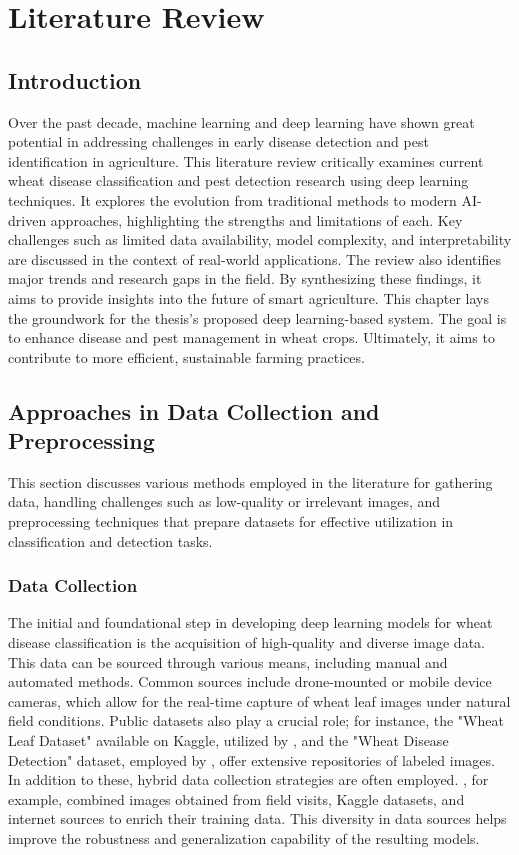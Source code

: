 \chapter{Literature Review}

\section{Introduction}
Over the past decade, machine learning and deep learning have shown great potential in addressing challenges in early disease detection and pest identification in agriculture. This literature review critically examines current wheat disease classification and pest detection research using deep learning techniques. It explores the evolution from traditional methods to modern AI-driven approaches, highlighting the strengths and limitations of each. Key challenges such as limited data availability, model complexity, and interpretability are discussed in the context of real-world applications. The review also identifies major trends and research gaps in the field. By synthesizing these findings, it aims to provide insights into the future of smart agriculture. This chapter lays the groundwork for the thesis’s proposed deep learning-based system. The goal is to enhance disease and pest management in wheat crops. Ultimately, it aims to contribute to more efficient, sustainable farming practices.

\section{Approaches in Data Collection and Preprocessing }
This section discusses various methods employed in the literature for gathering data, handling challenges such as low-quality or irrelevant images, and preprocessing techniques that prepare datasets for effective utilization in classification and detection tasks.

\subsection{Data Collection}
The initial and foundational step in developing deep learning models for wheat disease classification is the acquisition of high-quality and diverse image data. This data can be sourced through various means, including manual and automated methods. Common sources include drone-mounted or mobile device cameras, which allow for the real-time capture of wheat leaf images under natural field conditions. Public datasets also play a crucial role; for instance, the "Wheat Leaf Dataset" available on Kaggle, utilized by \parencite{ramadan2024improving}, and the "Wheat Disease Detection" dataset, employed by \parencite{reis2024integrated}, offer extensive repositories of labeled images. In addition to these, hybrid data collection strategies are often employed. \parencite{hassan2024wheat}, for example, combined images obtained from field visits, Kaggle datasets, and internet sources to enrich their training data. This diversity in data sources helps improve the robustness and generalization capability of the resulting models.


